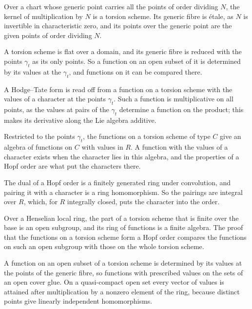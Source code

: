 Over a chart whose generic point carries all the points of order dividing $N$, the kernel of multiplication by $N$ is a
torsion scheme. Its generic fibre is \'etale, as $N$ is invertible in characteristic zero, and its points over the generic
point are the given points of order dividing $N$.

A torsion scheme is flat over a domain, and its generic fibre is reduced with the points $\gamma_t$ as its only points. So a
function on an open subset of it is determined by its values at the $\gamma_t$, and functions on it can be compared there.

A Hodge--Tate form is read off from a function on a torsion scheme with the values of a character at the points
$\gamma_t$. Such a function is multiplicative on all points, as the values at pairs of the $\gamma_t$ determine a function
on the product; this makes its derivative along the Lie algebra additive.

Restricted to the points $\gamma_t$, the functions on a torsion scheme of type $C$ give an algebra of functions on $C$
with values in $R$. A function with the values of a character exists when the character lies in this algebra, and the
properties of a Hopf order are what put the characters there.

The dual of a Hopf order is a finitely generated ring under convolution, and pairing it with a character is a ring
homomorphism. So the pairings are integral over $R$, which, for $R$ integrally closed, puts the character into the order.

Over a Henselian local ring, the part of a torsion scheme that is finite over the base is an open subgroup, and its ring of
functions is a finite algebra. The proof that the functions on a torsion scheme form a Hopf order compares the functions on
such an open subgroup with those on the whole torsion scheme.

A function on an open subset of a torsion scheme is determined by its values at the points of the generic fibre, so
functions with prescribed values on the sets of an open cover glue. On a quasi-compact open set every vector of values is
attained after multiplication by a nonzero element of the ring, because distinct points give linearly independent
homomorphisms.

